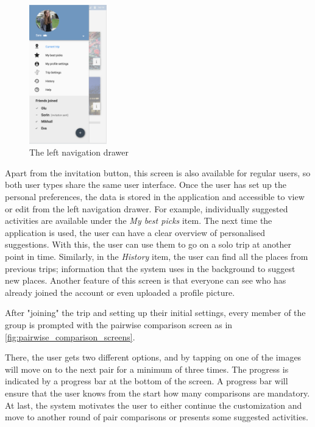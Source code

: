\documentclass[11pt,a4paper,oneside]{article}
\begin{document}
\begin{figure}[H]
    \centering
    \includegraphics[width=0.3\textwidth]{paper/imgs/hifi_prototypes/left_screen.png}
    \caption{The left navigation drawer}
    \label{fig:left_menu}
\end{figure}


Apart from the invitation button, this screen is also available for regular users, so both user types share the same user interface. Once the user has set up the personal preferences, the data is stored in the application and accessible to view or edit from the left navigation drawer. For example, individually suggested activities are available under the \emph{My best picks} item. The next time the application is used, the user can have a clear overview of personalised suggestions. With this, the user can use them to go on a solo trip at another point in time. Similarly, in the \emph{History} item, the user can find all the places from previous trips; information that the system uses in the background to suggest new places. Another feature of this screen is that everyone can see who has already joined the account or even uploaded a profile picture.

After "joining" the trip and setting up their initial settings, every member of the group is prompted with the pairwise comparison screen as in \autoref{fig:pairwise_comparison_screens}.

There, the user gets two different options, and by tapping on one of the images will move on to the next pair for a minimum of three times. The progress is indicated by a progress bar at the bottom of the screen. A progress bar will ensure that the user knows from the start how many comparisons are mandatory.  At last, the system motivates the user to either continue the customization and move to another round of pair comparisons or presents some suggested activities.
\end{document}
